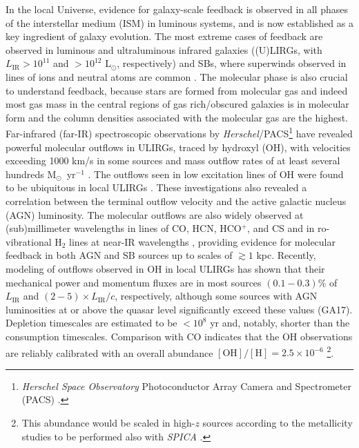 \documentclass{pasa}%
\newcommand{\Lsun}{{\hbox {L$_\odot$}}}
\newcommand{\Msun}{{\hbox {M$_\odot$}}}
\begin{document}
In the local Universe, evidence for galaxy-scale feedback is observed in all
phases of the interstellar medium (ISM) in luminous systems, and is now
established as a key ingredient of galaxy evolution. The most extreme cases of
feedback are observed in luminous and ultraluminous infrared galaxies 
((U)LIRGs, with $L_{\mathrm{IR}}>10^{11}$ and $>10^{12}$ \Lsun, 
respectively) and SBs, where superwinds observed in lines of ions and
neutral atoms are common 
\citep[e.g.][]{hec90,hec15,lip05,vei05,rup05,mar06,spo09,rod13,jan16}. The 
molecular phase is also crucial to understand feedback, because stars are
formed from molecular gas and indeed most gas mass in the central regions of 
gas rich/obscured galaxies is in molecular form and the column densities
  associated with the molecular gas are the highest.
Far-infrared (far-IR) spectroscopic observations by  
{\it Herschel}/PACS\footnote{{\it Herschel Space Observatory} Photoconductor 
Array Camera and Spectrometer (PACS) \citep{pil10,pog10}.} have revealed
powerful molecular outflows in ULIRGs, traced by hydroxyl (OH), with
velocities exceeding 1000 km/s in some sources and mass 
outflow rates of at least several hundreds \Msun\ yr$^{-1}$ 
\citep[][hereafter GA14 and GA17]{fis10,stu11,gon14,gon17}. The outflows seen
in low excitation lines of OH were found to be ubiquitous in
local ULIRGs \citep[Fig.~\ref{art},][]{spo13,vei13,sto16}. These
investigations also revealed a 
correlation between the terminal outflow velocity and the 
active galactic nucleus (AGN) luminosity.
The molecular outflows are also widely observed at (sub)millimeter 
wavelengths in lines of CO, HCN, HCO$^+$, and CS 
\citep{sak09,fer10,fer15,ala11,ala15,cic12,cic14,das12,aal12,aal15,com13,lin16,gar15,per16,ima16,pri17,vei17}
and in ro-vibrational H$_2$ lines at near-IR wavelengths \citep{rup13a},
providing evidence for molecular feedback in both AGN and SB sources up to
scales of $\gtrsim1$ kpc. Recently, modeling of outflows observed in OH in
local ULIRGs has shown that their mechanical power and momentum fluxes are 
in most sources $(0.1-0.3)$\% of $L_{\mathrm{IR}}$ and 
$(2-5)\times L_{\mathrm{IR}}/c$, respectively, although some sources with AGN
luminosities at or above the quasar level significantly exceed these 
values (GA17). Depletion timescales are estimated to be $<10^8$ yr and,
notably, shorter than the consumption timescales. Comparison with CO indicates
that the OH observations are reliably calibrated with an overall abundance 
$\mathrm{[OH]/[H]}=2.5\times10^{-6}$ \footnote{This
abundance would be scaled in high-$z$ sources according to the metallicity
studies to be performed also with {\it SPICA} \citep{fer17}.}.
\end{document}
